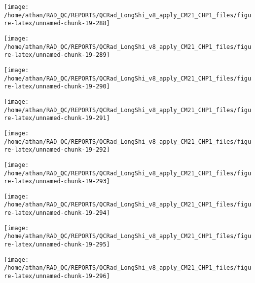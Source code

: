 \documentclass[
  10pt,
  a4paper,oneside]{article}
\begin{document}
\begin{center}\texttt{[image: /home/athan/RAD\_QC/REPORTS/QCRad\_LongShi\_v8\_apply\_CM21\_CHP1\_files/figure-latex/unnamed-chunk-19-288]} \end{center}

\begin{center}\texttt{[image: /home/athan/RAD\_QC/REPORTS/QCRad\_LongShi\_v8\_apply\_CM21\_CHP1\_files/figure-latex/unnamed-chunk-19-289]} \end{center}

\begin{center}\texttt{[image: /home/athan/RAD\_QC/REPORTS/QCRad\_LongShi\_v8\_apply\_CM21\_CHP1\_files/figure-latex/unnamed-chunk-19-290]} \end{center}

\begin{center}\texttt{[image: /home/athan/RAD\_QC/REPORTS/QCRad\_LongShi\_v8\_apply\_CM21\_CHP1\_files/figure-latex/unnamed-chunk-19-291]} \end{center}

\begin{center}\texttt{[image: /home/athan/RAD\_QC/REPORTS/QCRad\_LongShi\_v8\_apply\_CM21\_CHP1\_files/figure-latex/unnamed-chunk-19-292]} \end{center}

\begin{center}\texttt{[image: /home/athan/RAD\_QC/REPORTS/QCRad\_LongShi\_v8\_apply\_CM21\_CHP1\_files/figure-latex/unnamed-chunk-19-293]} \end{center}

\begin{center}\texttt{[image: /home/athan/RAD\_QC/REPORTS/QCRad\_LongShi\_v8\_apply\_CM21\_CHP1\_files/figure-latex/unnamed-chunk-19-294]} \end{center}

\begin{center}\texttt{[image: /home/athan/RAD\_QC/REPORTS/QCRad\_LongShi\_v8\_apply\_CM21\_CHP1\_files/figure-latex/unnamed-chunk-19-295]} \end{center}

\begin{center}\texttt{[image: /home/athan/RAD\_QC/REPORTS/QCRad\_LongShi\_v8\_apply\_CM21\_CHP1\_files/figure-latex/unnamed-chunk-19-296]} \end{center}
\end{document}
